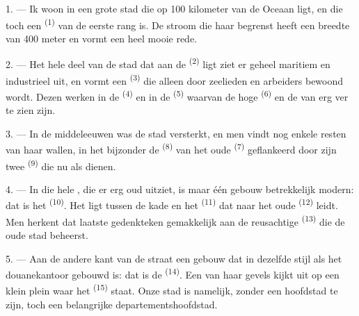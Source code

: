 
\VUsaut{2.0mm}
\VUsaut{3.0mm}
\VUfilet{16mm}
\VUsaut{5.6mm}
\VUsaut{1.4mm}
\VUsaut{2.2mm}

\VUsaut{3.0mm}

1. --- Ik woon in een grote stad die op 100 kilometer van de Oceaan ligt, en die toch een
 \textsuperscript{(1)} van de eerste rang is. De stroom die haar begrenst heeft
een breedte van 400 meter en vormt een heel mooie rede.

2. --- Het hele deel van de stad dat aan de  \textsuperscript{(2)} ligt ziet er
geheel maritiem en industrieel uit, en vormt een  \textsuperscript{(3)} die
alleen door zeelieden en arbeiders bewoond wordt. Dezen werken in de 
\textsuperscript{(4)} en in de  \textsuperscript{(5)} waarvan de hoge
 \textsuperscript{(6)} en de  van erg ver te zien zijn.

3. --- In de middeleeuwen was de stad versterkt, en men vindt nog enkele resten van haar
wallen, in het bijzonder de  \textsuperscript{(8)} van het oude
 \textsuperscript{(7)} geflankeerd door zijn twee 
\textsuperscript{(9)} die nu als  dienen.

4. --- In die hele , die er erg oud uitziet, is maar één gebouw betrekkelijk
modern: dat is het  \textsuperscript{(10)}. Het ligt tussen de kade en
het  \textsuperscript{(11)} dat naar het oude 
\textsuperscript{(12)} leidt. Men herkent dat laatste gedenkteken gemakkelijk aan de
reusachtige  \textsuperscript{(13)} die de oude stad beheerst.

5. --- Aan de andere kant van de straat  een gebouw dat in dezelfde stijl als
het douanekantoor gebouwd is: dat is de  \textsuperscript{(14)}. Een van haar
gevels kijkt uit op een klein plein waar het
 \textsuperscript{(15)} staat. Onze stad is namelijk,
zonder een hoofdstad te zijn, toch een belangrijke departementshoofdstad.

